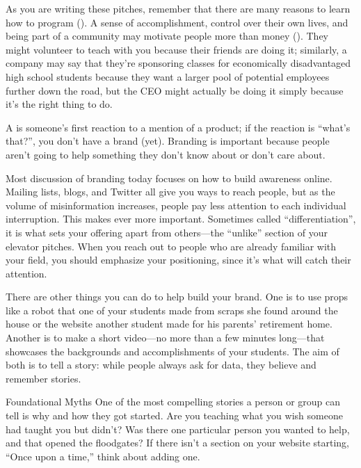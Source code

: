 As you are writing these pitches,
remember that there are many reasons to learn how to program
().
A sense of accomplishment,
control over their own lives,
and being part of a community may motivate people more than money
().
They might volunteer to teach with you because their friends are doing it;
similarly,
a company may say that they're sponsoring classes for economically disadvantaged high school students
because they want a larger pool of potential employees further down the road,
but the CEO might actually be doing it simply because it's the right thing to do.


A  is someone's first reaction to a mention of a product;
if the reaction is ``what's that?'',
you don't have a brand (yet).
Branding is important because
people aren't going to help something they don't know about or don't care about.

Most discussion of branding today focuses on
how to build awareness online.
Mailing lists,
blogs,
and Twitter all give you ways to reach people,
but as the volume of misinformation increases,
people pay less attention to each individual interruption.
This makes  ever more important.
Sometimes called ``differentiation'',
it is what sets your offering apart from others---the ``unlike'' section of your elevator pitches.
When you reach out to people who are already familiar with your field,
you should emphasize your positioning,
since it's what will catch their attention.

There are other things you can do to help build your brand.
One is to use props
like a robot that one of your students made from scraps she found around the house
or the website another student made for his parents' retirement home.
Another is to make a short video---no more than a few minutes long---that showcases
the backgrounds and accomplishments of your students.
The aim of both is to tell a story:
while people always ask for data,
they believe and remember stories.

\begin{aside}{Foundational Myths}
  One of the most compelling stories a person or group can tell is
  why and how they got started.
  Are you teaching what you wish someone had taught you but didn't?
  Was there one particular person you wanted to help,
  and that opened the floodgates?
  If there isn't a section on your website starting, ``Once upon a time,''
  think about adding one.
\end{aside}

